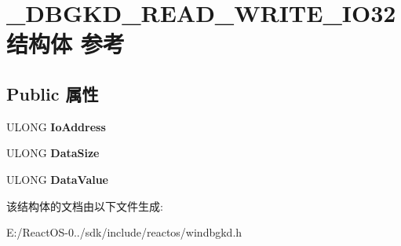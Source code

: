 \hypertarget{struct___d_b_g_k_d___r_e_a_d___w_r_i_t_e___i_o32}{}\section{\+\_\+\+D\+B\+G\+K\+D\+\_\+\+R\+E\+A\+D\+\_\+\+W\+R\+I\+T\+E\+\_\+\+I\+O32结构体 参考}
\label{struct___d_b_g_k_d___r_e_a_d___w_r_i_t_e___i_o32}
\subsection*{Public 属性}
\begin{DoxyCompactItemize}
\item 
\mbox{\label{struct___d_b_g_k_d___r_e_a_d___w_r_i_t_e___i_o32_af7eae01feee1975690e25c076436a2f4}} 
U\+L\+O\+NG {\bfseries Io\+Address}
\item 
\mbox{\label{struct___d_b_g_k_d___r_e_a_d___w_r_i_t_e___i_o32_a22d61df99e89de3c76504ca23813acb6}} 
U\+L\+O\+NG {\bfseries Data\+Size}
\item 
\mbox{\label{struct___d_b_g_k_d___r_e_a_d___w_r_i_t_e___i_o32_ac1ebf7fbe2d42fef60dc402310fb5e7c}} 
U\+L\+O\+NG {\bfseries Data\+Value}
\end{DoxyCompactItemize}


该结构体的文档由以下文件生成\+:\begin{DoxyCompactItemize}
\item 
E\+:/\+React\+O\+S-\/0../sdk/include/reactos/windbgkd.\+h\end{DoxyCompactItemize}
